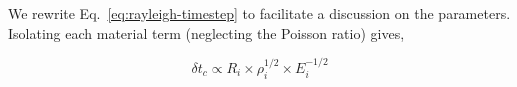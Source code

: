 We rewrite Eq.~\ref{eq:rayleigh-timestep} to facilitate a discussion on the parameters. Isolating each material term (neglecting the Poisson ratio) gives, 

\begin{equation}
	\delta t_c \propto R_i \times \rho_i^{1/2} \times E_i^{-1/2}
\end{equation}








